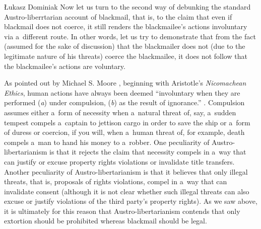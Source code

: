 \begin{artengenv}{Łukasz Dominiak}
Now let us turn to the second way of debunking the standard Austro-liberrtarian account of blackmail, that is, to the claim that even if blackmail does not coerce, it still renders the blackmailee's actions involuntary via a~different route. In other words, let us try to demonstrate that from the fact (assumed for the sake of discussion) that the blackmailer does not (due to the legitimate nature of his threats) coerce the blackmailee, it does not follow that the blackmailee's actions are voluntary.



As pointed out by Michael S. Moore 
\parencite*[][p.85]{moore_law_1984}, %
 beginning with Aristotle's \textit{Nicomachean Ethics}, human actions have always been deemed ``involuntary when they are performed (\textit{a}) under compulsion, (\textit{b}) as the result of ignorance.'' 
\parencite[p.~77\ \mbox{[Book III, Chap.~I, 1110a]}]{aristotle_nicomachean_1955}. %
 Compulsion assumes either a~form of necessity when a~natural threat of, say, a~sudden tempest compels a~captain to jettison cargo in order to save the ship or a~form of duress or coercion, if you will, when a~human threat of, for example, death compels a~man to hand his money to a~robber. One peculiarity of Austro-libertarianism is that it rejects the claim that necessity compels in a~way that can justify or excuse property rights violations or invalidate title transfers. Another peculiarity of Austro-libertarianism is that it believes that only illegal threats, that is, proposals of rights violations, compel in a~way that can invalidate consent (although it is not clear whether such illegal threats can also excuse or justify violations of the third party's property rights). As we saw above, it is ultimately for this reason that Austro-libertarianism contends that only extortion should be prohibited whereas blackmail should be legal.




\end{artengenv}
